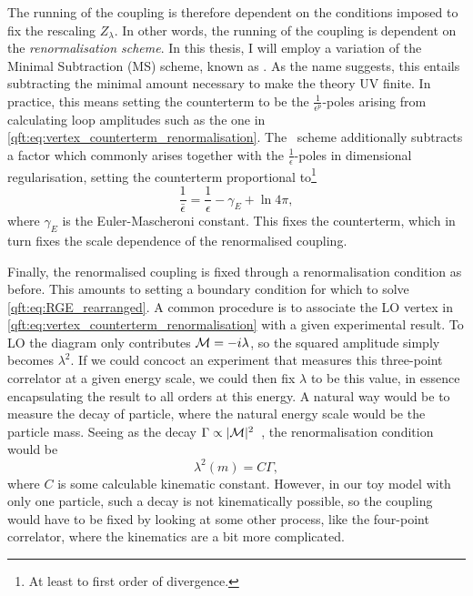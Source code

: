 \documentclass[../main.tex]{subfiles}
\begin{document}
The running of the coupling is therefore dependent on the conditions imposed to fix the rescaling \(Z_\lambda\).
In other words, the running of the coupling is dependent on the \emph{renormalisation scheme}.
In this thesis, I will employ a variation of the Minimal Subtraction (MS) scheme, known as \MSbar\@.
As the name suggests, this entails subtracting the minimal amount necessary to make the theory UV finite.
In practice, this means setting the counterterm to be the \(\frac{1}{\epsilon^p}\)-poles arising from calculating loop amplitudes such as the one in \cref{qft:eq:vertex_counterterm_renormalisation}.
The \MSbar\ scheme additionally subtracts a factor which commonly arises together with the \(\frac{1}{\epsilon}\)-poles in dimensional regularisation, setting the counterterm proportional to\footnote{At least to first order of divergence.}
\begin{equation}
  \frac{1}{\bar\epsilon} = \frac{1}{\epsilon} - \gamma_E + \ln 4\pi,
\end{equation}
where \(\gamma_E\) is the Euler-Mascheroni constant.
This fixes the counterterm, which in turn fixes the scale dependence of the renormalised coupling.
\medskip

Finally, the renormalised coupling is fixed through a renormalisation condition as before.
This amounts to setting a boundary condition for which to solve \cref{qft:eq:RGE_rearranged}.
A common procedure is to associate the LO vertex in \cref{qft:eq:vertex_counterterm_renormalisation} with a given experimental result.
To LO the diagram only contributes \(\mathcal{M} = -i\lambda\), so the squared amplitude simply becomes \(\lambda^2\).
If we could concoct an experiment that measures this three-point correlator at a given energy scale, we could then fix \(\lambda\) to be this value, in essence encapsulating the result to all orders at this energy.
A natural way would be to measure the decay of particle, where the natural energy scale would be the particle mass.
Seeing as the decay \(\Gamma \propto |\mathcal{M}|^2\)~\cite{Schwartz:2014sze}, the renormalisation condition would be
\begin{equation}
  \lambda^2(m) = C \Gamma,
\end{equation}
where \(C\) is some calculable kinematic constant.
However, in our toy model with only one particle, such a decay is not kinematically possible, so the coupling would have to be fixed by looking at some other process, like the four-point correlator, where the kinematics are a bit more complicated.
\end{document}
